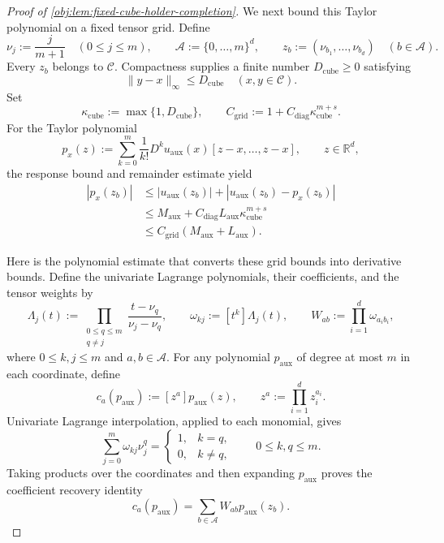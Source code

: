 \documentclass[11pt]{article}
\begin{document}
\begin{proof}[Proof of \cref{obj:lem:fixed-cube-holder-completion}]
We next bound this Taylor polynomial on a fixed tensor grid. Define
\[
\nu_j:=\frac{j}{m+1}\quad(0\le j\le m),\qquad
\mathscr A:=\{0,\ldots,m\}^d,\qquad
z_b:=(\nu_{b_1},\ldots,\nu_{b_d})
\quad(b\in\mathscr A).
\]
Every \(z_b\) belongs to \(\mathscr C\). Compactness supplies a finite number \(D_{\mathrm{cube}}\ge0\) satisfying
\[
\|y-x\|_\infty\le D_{\mathrm{cube}}
\quad(x,y\in\mathscr C).
\]
Set
\[
\kappa_{\mathrm{cube}}:=\max\{1,D_{\mathrm{cube}}\},
\qquad
C_{\mathrm{grid}}
:=
1+C_{\mathrm{diag}}\kappa_{\mathrm{cube}}^{m+s}.
\]
For the Taylor polynomial
\[
p_x(z):=
\sum_{k=0}^{m}\frac{1}{k!}
D^k u_{\mathrm{aux}}(x)[z-x,\ldots,z-x],
\qquad z\in\mathbb R^d,
\]
the response bound and remainder estimate yield
\[
\begin{aligned}
|p_x(z_b)|
&\le |u_{\mathrm{aux}}(z_b)|
   +|u_{\mathrm{aux}}(z_b)-p_x(z_b)|\\
&\le M_{\mathrm{aux}}
   +C_{\mathrm{diag}}L_{\mathrm{aux}}
      \kappa_{\mathrm{cube}}^{m+s}\\
&\le C_{\mathrm{grid}}
      (M_{\mathrm{aux}}+L_{\mathrm{aux}}).
\end{aligned}
\]

Here is the polynomial estimate that converts these grid bounds into derivative bounds. Define the univariate Lagrange polynomials, their coefficients, and the tensor weights by
\[
\Lambda_j(t):=
\prod_{\substack{0\le q\le m\\q\ne j}}
\frac{t-\nu_q}{\nu_j-\nu_q},
\qquad
\omega_{kj}:=[t^k]\Lambda_j(t),
\qquad
W_{ab}:=\prod_{i=1}^d\omega_{a_i b_i},
\]
where \(0\le k,j\le m\) and \(a,b\in\mathscr A\).
For any polynomial \(p_{\mathrm{aux}}\) of degree at most \(m\) in each coordinate, define
\[
c_a(p_{\mathrm{aux}}):=[z^a]p_{\mathrm{aux}}(z),
\qquad
z^a:=\prod_{i=1}^d z_i^{a_i}.
\]
Univariate Lagrange interpolation, applied to each monomial, gives
\[
\sum_{j=0}^m\omega_{kj}\nu_j^q
=
\begin{cases}
1,&k=q,\\
0,&k\ne q,
\end{cases}
\qquad 0\le k,q\le m.
\]
Taking products over the coordinates and then expanding \(p_{\mathrm{aux}}\) proves the coefficient recovery identity
\[
c_a(p_{\mathrm{aux}})
=
\sum_{b\in\mathscr A}W_{ab}p_{\mathrm{aux}}(z_b).
\]


\end{proof}
\end{document}
